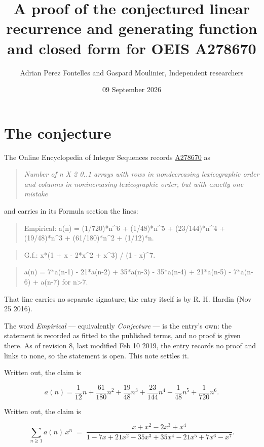 \documentclass[11pt]{article}
\title{A proof of the conjectured linear recurrence and generating function and closed form for OEIS A278670}
\author{Adrian Perez Fontelles and Gaspard Moulinier, Independent researchers}
\date{09 September 2026}
\theoremstyle{definition}
\begin{document}
\maketitle
\section{The conjecture}

The Online Encyclopedia of Integer Sequences records \href{https://oeis.org/A278670}{A278670} as

\begin{quote}\itshape Number of n X 2 0..1 arrays with rows in nondecreasing lexicographic order and columns in nonincreasing lexicographic order, but with exactly one mistake\end{quote}

and carries in its Formula section the lines:

\begin{quote}\ttfamily Empirical: a(n) = (1/720)*n\textasciicircum{}6 + (1/48)*n\textasciicircum{}5 + (23/144)*n\textasciicircum{}4 + (19/48)*n\textasciicircum{}3 + (61/180)*n\textasciicircum{}2 + (1/12)*n.\end{quote}

\begin{quote}\ttfamily G.f.: x*(1 + x - 2*x\textasciicircum{}2 + x\textasciicircum{}3) / (1 - x)\textasciicircum{}7.\end{quote}

\begin{quote}\ttfamily a(n) = 7*a(n-1) - 21*a(n-2) + 35*a(n-3) - 35*a(n-4) + 21*a(n-5) - 7*a(n-6) + a(n-7) for n>7.\end{quote}

That line carries no separate signature; the entry itself is by R. H. Hardin (Nov 25 2016).

The word {\itshape Empirical} --- equivalently {\itshape Conjecture} --- is the entry's own: the statement is recorded as fitted to the published terms, and no proof is given there. As of revision 8, last modified Feb 10 2019, the entry records no proof and links to none, so the statement is open. This note settles it.

Written out, the claim is

\[a(n) = \frac{1}{12}n + \frac{61}{180}n^{2} + \frac{19}{48}n^{3} + \frac{23}{144}n^{4} + \frac{1}{48}n^{5} + \frac{1}{720}n^{6}.\]

Written out, the claim is

\[\sum_{n \ge 1} a(n)\,x^n \;=\; \frac{x + x^{2} - 2x^{3} + x^{4}}{1 - 7x + 21x^{2} - 35x^{3} + 35x^{4} - 21x^{5} + 7x^{6} - x^{7}}.\]
\end{document}

